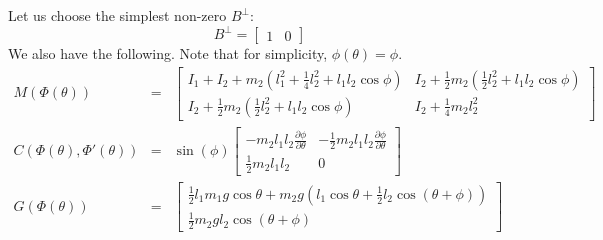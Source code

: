 Let us choose the simplest non-zero $B^{\bot}$:
\begin{equation*}
	B^{\bot}=\begin{bmatrix} 1 & 0 \end{bmatrix}
\end{equation*}
We also have the following. Note that for simplicity, $\phi(\theta) = \phi$.
\begin{eqnarray*}
	M\left(\Phi(\theta)\right) &=& \begin{bmatrix}
		I_1 + I_2 + m_2\left(l_1^2 + \frac{1}{4}l_2^2 + l_1l_2\cos{\phi}\right) &
		I_2 + \frac{1}{2}m_2\left(\frac{1}{2}l_2^2 + l_1l_2\cos{\phi}\right) \\
		I_2 + \frac{1}{2}m_2\left(\frac{1}{2}l_2^2 + l_1l_2\cos{\phi}\right) &
		I_2 + \frac{1}{4}m_2l_2^2
	\end{bmatrix} \\
	C\left(\Phi(\theta),\Phi'(\theta)\right) &=& \sin({\phi}) \begin{bmatrix}
		-m_2 l_1 l_2 \frac{\partial\phi}{\partial\theta} &
		-\frac{1}{2}m_2 l_1 l_2 \frac{\partial\phi}{\partial\theta} \\
		\frac{1}{2}m_2 l_1 l_2  & 0
	\end{bmatrix} \\
	G\left(\Phi(\theta)\right) &=& \begin{bmatrix}
		\frac{1}{2}l_1m_1g\cos{\theta} + m_2 g \left(l_1 \cos{\theta} + 
		\frac{1}{2}l_2 \cos{\left(\theta + \phi\right)} \right) \\
		\frac{1}{2} m_2 g l_2 \cos{\left(\theta + \phi\right)}
	\end{bmatrix}
\end{eqnarray*}